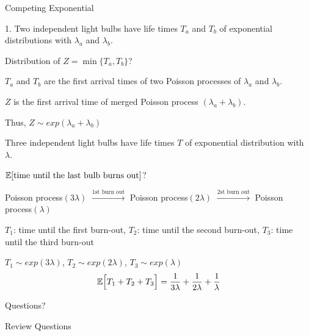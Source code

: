 \documentclass[fleqn,aspectratio=169]{beamer}
\begin{document}
\begin{frame}{Competing Exponential}

{
\small
\plitemsep 0.1in
\bci
\item[1.] Two independent light bulbs have life times $T_a$ and $T_b$ of exponential distributions with $\lambda_a$ and $\lambda_b.$

\item<2->  Distribution of $Z = \min\{T_a, T_b \}$?

\bigskip

\item<3-> $T_a$ and $T_b$ are the first arrival times of two Poisson processes of $\lambda_a$ and $\lambda_b.$

\item<5-> $Z$ is the first arrival time of merged Poisson process $(\lambda_a + \lambda_b)$. 

\item<6-> Thus, $Z \sim exp(\lambda_a + \lambda_b)$
\eci
}
{
\small
\plitemsep 0.05in
\bci
\item<7->[2.] Three independent light bulbs have life times $T$ of exponential distribution with $\lambda.$ 

\item<8->  $\mathbb{E}[ \text{time until the last bulb burns out} ]$?

\bigskip

\item<9-> Poisson process$(3\lambda)$ $\xrightarrow{\text{1st burn out}}$ Poisson process$(2\lambda)$ $\xrightarrow{\text{2st burn out}}$ Poisson process$(\lambda)$ 

\item<10-> $T_1$: time until the first burn-out, $T_2$: time until the second burn-out, $T_3$: time until the third burn-out

\item<11-> $T_1 \sim exp(3\lambda)$, $T_2 \sim exp(2\lambda)$, $T_3 \sim exp(\lambda)$
$$
\mathbb{E}\Bigl[ T_1 + T_2 + T_3 \Bigr] = \frac{1}{3 \lambda} + \frac{1}{2 \lambda} + \frac{1}{ \lambda} $$

\eci
}

\end{frame}

\begin{frame}{}
\vspace{2cm}
\LARGE Questions?

\end{frame}

\begin{frame}{Review Questions}

\bce[1)]
\item 

\ece

\end{frame}
\end{document}
